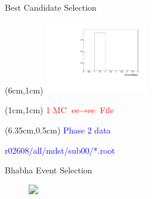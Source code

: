 \documentclass[8pt]{beamer}
\begin{document}
\begin{frame}{Best Candidate Selection}
	
\begin{textblock*}{0.5\textwidth}(6cm,1cm)
	\includegraphics[width=4.5cm]{Plots/nCandData}
\end{textblock*}
	
	
\begin{textblock*}{0.5\textwidth}(1cm,1cm)
	\footnotesize
	\textcolor{red}{1 MC $\textrm{ee} \rightarrow \textrm{ee}$ File}
\end{textblock*}	
	
\begin{textblock*}{0.5\textwidth}(6.35cm,0.5cm)
	\footnotesize
	\textcolor{blue}{Phase 2 data}
	
	\textcolor{blue}{r02608/all/mdst/sub00/*.root}
\end{textblock*}	

	
	
	
\end{frame}


\begin{frame}{Bhabha Event Selection}

	\begin{figure}
		\centering
		\includegraphics<1>[width=\textwidth]{Plots/b2b_2}
	\end{figure}
	
\end{frame}
	
\end{document}
